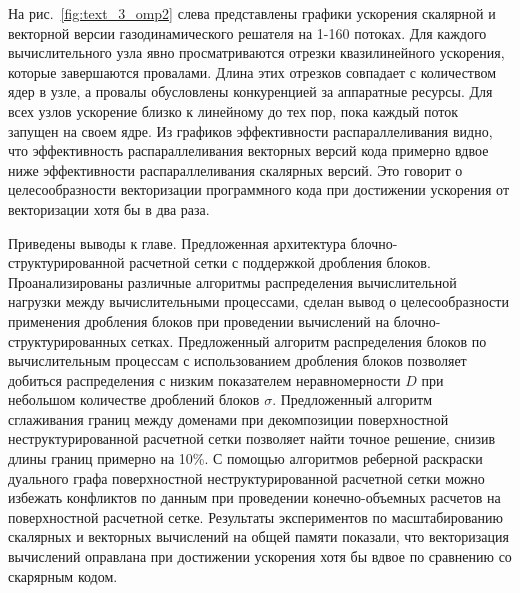\documentclass[a4paper,14pt]{extarticle}                     %
\theoremstyle{plain}                                         %
\begin{document}
На рис.~\ref{fig:text_3_omp2} слева представлены графики ускорения скалярной и векторной версии газодинамического решателя на 1-160 потоках.
Для каждого вычислительного узла явно просматриваются отрезки квазилинейного ускорения, которые завершаются провалами.
Длина этих отрезков совпадает с количеством ядер в узле, а провалы обусловлены конкуренцией за аппаратные ресурсы.
Для всех узлов ускорение близко к линейному до тех пор, пока каждый поток запущен на своем ядре.
Из графиков эффективности распараллеливания видно, что эффективность распараллеливания векторных версий кода примерно вдвое ниже эффективности распараллеливания скалярных версий.
Это говорит о целесообразности векторизации программного кода при достижении ускорения от векторизации хотя бы в два раза.


Приведены выводы к главе.
Предложенная архитектура блочно-структу\-рированной расчетной сетки с поддержкой дробления блоков.
Проанализированы различные алгоритмы распределения вычислительной нагрузки между вычислительными процессами, сделан вывод о целесообразности применения дробления блоков при проведении вычислений на блочно-структурированных сетках.
Предложенный алгоритм распределения блоков по вычислительным процессам с использованием дробления блоков позволяет добиться распределения с низким показателем неравномерности $D$ при небольшом количестве дроблений блоков $\sigma$.
Предложенный алгоритм сглаживания границ между доменами при декомпозиции поверхностной неструктурированной расчетной сетки позволяет найти точное решение, снизив длины границ примерно на 10\%.
С помощью алгоритмов реберной раскраски дуального графа поверхностной неструктурированной расчетной сетки можно избежать конфликтов по данным при проведении конечно-объемных расчетов на поверхностной расчетной сетке.
Результаты экспериментов по масштабированию скалярных и векторных вычислений на общей памяти показали, что векторизация вычислений оправлана при достижении ускорения хотя бы вдвое по сравнению со скарярным кодом.

\end{document}
